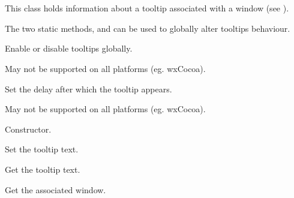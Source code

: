 %
%

\section{}\label{wxtooltip}

This class holds information about a tooltip associated with a window
(see ).

The two static methods,  and
 can be used to globally
alter tooltips behaviour.






\label{wxtooltipenable}


Enable or disable tooltips globally.

May not be supported on all platforms (eg. wxCocoa).


\label{wxtooltipsetdelay}


Set the delay after which the tooltip appears.

May not be supported on all platforms (eg. wxCocoa).

\label{wxtooltipwxtooltip}


Constructor.

\label{wxtooltipsettip}


Set the tooltip text.


\label{wxtooltipgettip}


Get the tooltip text.

\label{wxtooltipgetwindow}


Get the associated window.

